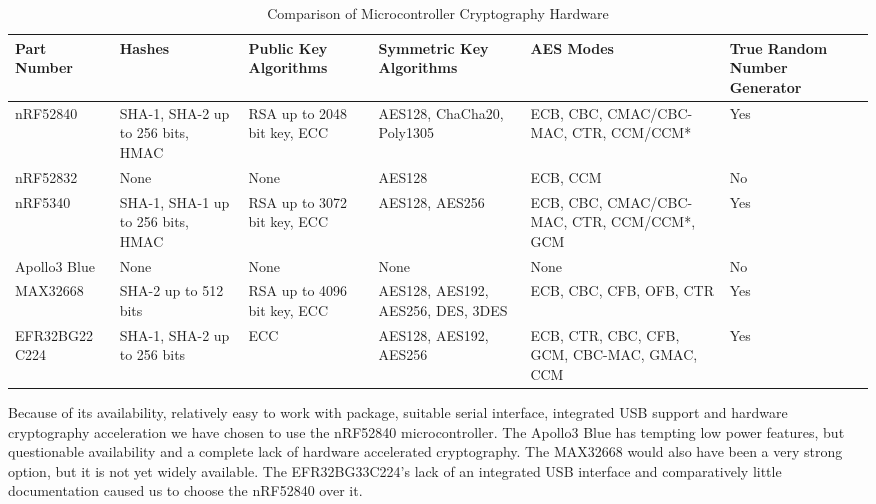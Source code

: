 \begin{table*}[htb]
\centering
\begin{tabular}{>{\centering\arraybackslash}m{2.5cm}|
                >{\centering\arraybackslash}m{2.0cm}|
                >{\centering\arraybackslash}m{2.0cm}|
                >{\centering\arraybackslash}m{2.5cm}|
                >{\centering\arraybackslash}m{2.5cm}|
                >{\centering\arraybackslash}m{1.5cm}}
\toprule
Part Number & Hashes & Public Key Algorithms & Symmetric Key Algorithms & AES Modes & True Random Number Generator \\
\midrule
nRF52840 & SHA-1, SHA-2 up to 256 bits, HMAC & RSA up to 2048 bit key, ECC & AES128, ChaCha20, Poly1305 & ECB, CBC, CMAC/CBC-MAC, CTR, CCM/CCM* & Yes \\
nRF52832 & None & None & AES128 & ECB, CCM & No \\
nRF5340 & SHA-1, SHA-1 up to 256 bits, HMAC & RSA up to 3072 bit key, ECC & AES128, AES256 & ECB, CBC, CMAC/CBC-MAC, CTR, CCM/CCM*, GCM & Yes \\
Apollo3 Blue & None & None & None & None & No \\
MAX32668 & SHA-2 up to 512 bits & RSA up to 4096 bit key, ECC & AES128, AES192, AES256, DES, 3DES & ECB, CBC, CFB, OFB, CTR & Yes \\
EFR32BG22 C224 & SHA-1, SHA-2 up to 256 bits & ECC & AES128, AES192, AES256 & ECB, CTR, CBC, CFB, GCM, CBC-MAC, GMAC, CCM & Yes \\
\bottomrule
\end{tabular}
\caption{Comparison of Microcontroller Cryptography Hardware}
\label{tab:mcu-comp-crypto}
\end{table*}

Because of its availability, relatively easy to work with package, suitable
serial interface, integrated USB support and hardware cryptography acceleration
we have chosen to use the nRF52840 microcontroller. The Apollo3 Blue has
tempting low power features, but questionable availability and a complete lack
of hardware accelerated cryptography. The MAX32668 would also have been a very
strong option, but it is not yet widely available. The EFR32BG33C224's lack of
an integrated USB interface and comparatively little documentation caused us to
choose the nRF52840 over it.


